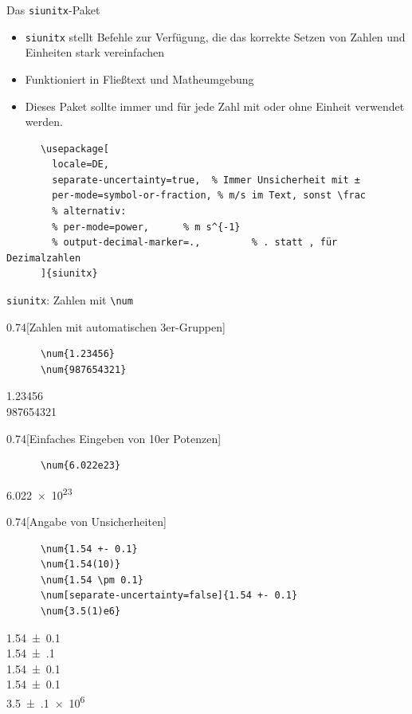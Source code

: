 \begin{frame}[fragile]{
  Das \texttt{siunitx}-Paket
  \hfill
}
\begin{itemize}
    \item \texttt{siunitx} stellt Befehle zur Verfügung, die das korrekte Setzen von Zahlen und Einheiten stark vereinfachen
    \item Funktioniert in Fließtext und Matheumgebung
    \item[$\color{vertexDarkRed}\Rightarrow$] Dieses Paket sollte \alert{immer} und für \alert{jede} Zahl mit oder ohne Einheit verwendet werden.
\end{itemize}
  \begin{Packages}
    \begin{verbatim}
      \usepackage[
        locale=DE,
        separate-uncertainty=true,  % Immer Unsicherheit mit ±
        per-mode=symbol-or-fraction, % m/s im Text, sonst \frac
        % alternativ:
        % per-mode=power,      % m s^{-1}
        % output-decimal-marker=.,         % . statt , für Dezimalzahlen
      ]{siunitx}
    \end{verbatim}
  \end{Packages}
\end{frame}

\begin{frame}[fragile]{\texttt{siunitx}: Zahlen mit \texttt{\backslash num}}
  \begin{CodeExample}{0.74}[Zahlen mit automatischen 3er-Gruppen]
    \begin{verbatim}
      \num{1.23456}
      \num{987654321}
    \end{verbatim}
  \CodeResult
    \strut
    \num{1.23456} \\
    \num{987654321}
  \end{CodeExample}
  \begin{CodeExample}{0.74}[Einfaches Eingeben von 10er Potenzen]
    \begin{verbatim}
      \num{6.022e23}
    \end{verbatim}
  \CodeResult
    \strut
    \num{6.022e23}
  \end{CodeExample}
  \begin{CodeExample}{0.74}[Angabe von Unsicherheiten]
    \begin{verbatim}
      \num{1.54 +- 0.1}
      \num{1.54(10)}
      \num{1.54 \pm 0.1}
      \num[separate-uncertainty=false]{1.54 +- 0.1}
      \num{3.5(1)e6}
    \end{verbatim}
  \CodeResult
    \strut
    \num{1.54 +- 0.1} \\
    \num{1.54(10)} \\
    \num{1.54 \pm 0.1} \\
    \num[separate-uncertainty=false]{1.54 +- 0.1} \\
    \num{3.5(1)e6}
  \end{CodeExample}
\end{frame}

